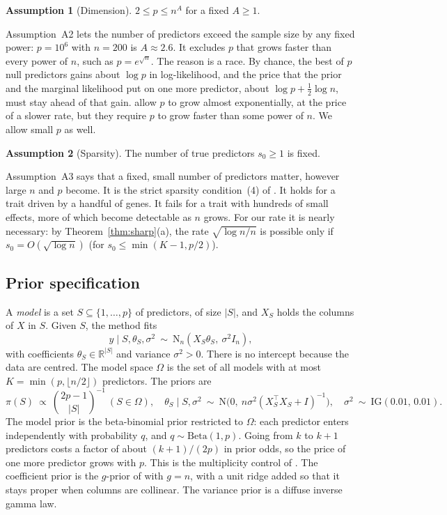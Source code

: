 \documentclass[11pt]{article}
\newcommand{\R}{\mathbb{R}}
\newcommand{\N}{\mathrm{N}}
\newcommand{\abs}[1]{\lvert #1\rvert}
\newcommand{\sz}{s_0}
\newcommand{\Om}{\Omega}
\newcommand{\rn}{\sqrt{\log n/n}}
\theoremstyle{plain}
\theoremstyle{definition}
\newtheorem{asm}{Assumption}
\begin{document}
\begin{asm}[Dimension]\label{a:dim}
$2\le p\le n^A$ for a fixed $A\ge1$.
\end{asm}

Assumption~A2 lets the number of predictors exceed the sample size by any fixed power: $p=10^6$ with $n=200$ is
$A\approx2.6$. It excludes $p$ that grows faster than every power of $n$, such as $p=e^{\sqrt n}$. The reason is a race.
By chance, the best of $p$ null predictors gains about $\log p$ in log-likelihood, and the price that the prior and the
marginal likelihood put on one more predictor, about $\log p+\tfrac12\log n$, must stay ahead of that gain.
\citet{SongLiang2015} allow $p$ to grow almost exponentially, at the price of a slower rate, but they require $p$ to
grow faster than some power of $n$. We allow small $p$ as well.

\begin{asm}[Sparsity]\label{a:sp}
The number of true predictors $\sz\ge1$ is fixed.
\end{asm}

Assumption~A3 says that a fixed, small number of predictors matter, however large $n$ and $p$ become. It is the strict
sparsity condition~(4) of \citet{SongLiang2015}. It holds for a trait driven by a handful of genes. It fails for a trait
with hundreds of small effects, more of which become detectable as $n$ grows. For our rate it is nearly necessary:
by Theorem~\ref{thm:sharp}(a), the rate $\rn$ is possible only if $\sz=O(\sqrt{\log n})$ (for $\sz\le\min(K-1,p/2)$).

\subsection{Prior specification}\label{sec:prior}

A \emph{model} is a set $S\subseteq\{1,\dots,p\}$ of predictors, of size $\abs{S}$, and $X_S$ holds the columns of $X$
in $S$. Given $S$, the method fits
\[
  y\mid S,\theta_S,\sigma^2\ \sim\ \N_n(X_S\theta_S,\ \sigma^2I_n),
\]
with coefficients $\theta_S\in\R^{\abs{S}}$ and variance $\sigma^2>0$. There is no intercept because the data are
centred. The model space $\Om$ is the set of all models with at most $K=\min(p,\lfloor n/2\rfloor)$ predictors. The
priors are
\[
  \pi(S)\ \propto\ \binom{2p-1}{\abs{S}}^{-1}\ (S\in\Om),\quad
  \theta_S\mid S,\sigma^2\ \sim\ \N\big(0,\ n\sigma^2(X_S^\top X_S+I)^{-1}\big),\quad
  \sigma^2\ \sim\ \mathrm{IG}(0.01,\,0.01).
\]
The model prior is the beta-binomial prior restricted to $\Om$: each predictor enters independently with probability
$q$, and $q\sim\mathrm{Beta}(1,p)$. Going from $k$ to $k+1$ predictors costs a factor of about $(k+1)/(2p)$ in prior
odds, so the price of one more predictor grows with $p$. This is the multiplicity control of \citet{ScottBerger2010}.
The coefficient prior is the $g$-prior of \citet{Zellner1986} with $g=n$, with a unit ridge added so that it stays proper
when columns are collinear. The variance prior is a diffuse inverse gamma law.
\end{document}
